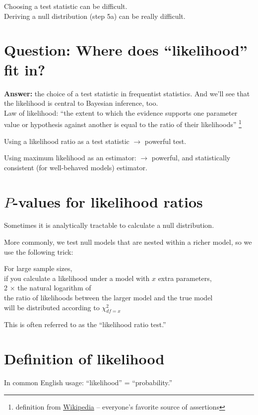 \documentclass[landscape]{foils}
\begin{document}
Choosing a test statistic can be difficult.\\
Deriving a null distribution (step 5a) can be really difficult.
\myNewSlide
\section*{Question: Where does ``likelihood'' fit in?}
{\bf Answer:} the choice of a test statistic in frequentist statistics.
And we'll see that the likelihood is central to Bayesian inference, too.\\

Law of likelihood: ``the extent to which the evidence supports one parameter value or hypothesis against another is equal to the ratio of their likelihoods''
\footnote{definition from \href{https://en.wikipedia.org/wiki/Likelihood_principle\#The\_law\_of\_likelihood}{Wikipedia} -- 
everyone's favorite source of assertions}

Using a likelihood ratio as a test statistic $\rightarrow$ powerful test.

Using maximum likelihood as an estimator: $\rightarrow$ powerful, and statistically consistent (for well-behaved models) estimator.

\myNewSlide
\section*{$P$-values for likelihood ratios}

Sometimes it is analytically tractable to calculate a null distribution.

More commonly, we test null models that are nested within a richer model,
so we use the following trick:

For large sample sizes,\\
if you calculate a likelihood under a model with $x$ extra parameters, \\
2 $\times$ the natural logarithm of\\
the ratio of likelihoods between the larger model and the true model \\
will
be distributed according to $\chi^2_{df=x}$

This is often referred to as the ``likelihood ratio test.''


\myNewSlide
\section*{Definition of likelihood}
In common English usage: ``likelihood'' = ``probability.''
\end{document}
